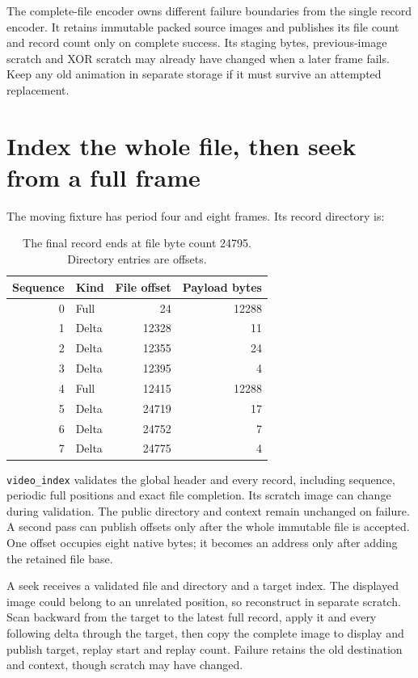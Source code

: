 The complete-file encoder owns different failure boundaries from the single
record encoder. It retains immutable packed source images and publishes its
file count and record count only on complete success. Its staging bytes,
previous-image scratch and XOR scratch may already have changed when a later
frame fails. Keep any old animation in separate storage if it must survive an
attempted replacement.

\section{Index the whole file, then seek from a full frame}

The moving fixture has period four and eight frames. Its record directory is:
\begin{table}[!ht]
  \centering
  \begin{tabular}{r l r r}
    \toprule
    Sequence & Kind  & File offset & Payload bytes \\
    \midrule
    0        & Full  & 24          & 12288         \\
    1        & Delta & 12328       & 11            \\
    2        & Delta & 12355       & 24            \\
    3        & Delta & 12395       & 4             \\
    4        & Full  & 12415       & 12288         \\
    5        & Delta & 24719       & 17            \\
    6        & Delta & 24752       & 7             \\
    7        & Delta & 24775       & 4             \\
    \bottomrule
  \end{tabular}
  \caption{The final record ends at file byte count 24795. Directory entries are offsets.}
\end{table}

\texttt{video\_index} validates the global header and every record, including
sequence, periodic full positions and exact file completion. Its scratch image
can change during validation. The public directory and context remain unchanged
on failure. A second pass can publish offsets only after the whole immutable
file is accepted. One offset occupies eight native bytes; it becomes an address
only after adding the retained file base.

A seek receives a validated file and directory and a target index. The displayed
image could belong to an unrelated position, so reconstruct in separate scratch.
Scan backward from the target to the latest full record, apply it and every
following delta through the target, then copy the complete image to display
and publish target, replay start and replay count. Failure retains the old
destination and context, though scratch may have changed.

